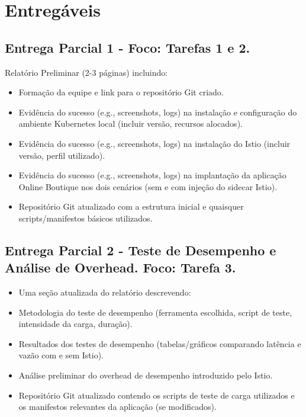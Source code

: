 \documentclass[12pt,a4paper]{report}
\begin{document}
\section{Entregáveis}
\subsection{Entrega Parcial 1 - Foco: Tarefas 1 e 2.} 
Relatório Preliminar (2-3 páginas) incluindo:
\begin{itemize}
    \item Formação da equipe e link para o repositório Git criado.
    \item Evidência do sucesso (e.g., screenshots, logs) na instalação e configuração do ambiente Kubernetes local (incluir versão, recursos alocados).
    \item Evidência do sucesso (e.g., screenshots, logs) na instalação do Istio (incluir versão, perfil utilizado).
    \item Evidência do sucesso (e.g., screenshots, logs) na implantação da aplicação Online Boutique nos dois cenários (sem e com injeção do sidecar Istio).
    \item Repositório Git atualizado com a estrutura inicial e quaisquer scripts/manifestos básicos utilizados.
\end{itemize}
    
\subsection{Entrega Parcial 2 - Teste de Desempenho e Análise de Overhead. Foco: Tarefa 3.} 
\begin{itemize}
    \item Uma seção atualizada do relatório descrevendo:
    \item Metodologia do teste de desempenho (ferramenta escolhida, script de teste, intensidade da carga, duração).
    \item Resultados dos testes de desempenho (tabelas/gráficos comparando latência e vazão com e sem Istio).
    \item Análise preliminar do overhead de desempenho introduzido pelo Istio.
    \item Repositório Git atualizado contendo os scripts de teste de carga utilizados e os manifestos relevantes da aplicação (se modificados).
\end{itemize} 
\end{document}
